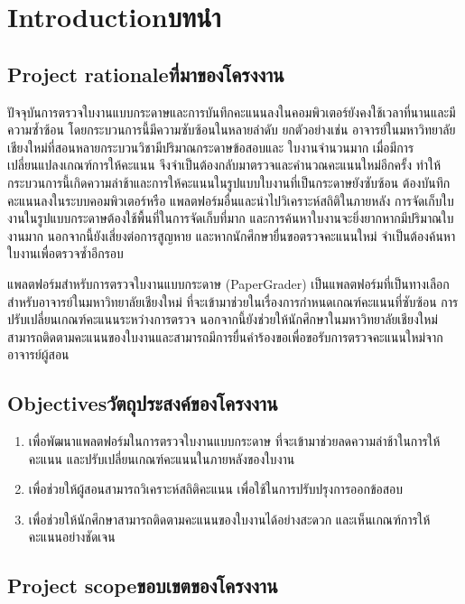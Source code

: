 \chapter{\ifenglish Introduction\else บทนำ\fi}

\section{\ifenglish Project rationale\else ที่มาของโครงงาน\fi}
\qquad ปัจจุบันการตรวจใบงานแบบกระดาษและการบันทึกคะแนนลงในคอมพิวเตอร์ยังคงใช้เวลาที่นานและมีความซ้ำซ้อน โดยกระบวนการนี้มีความซับซ้อนในหลายลำดับ ยกตัวอย่างเช่น อาจารย์ในมหาวิทยาลัยเชียงใหม่ที่สอนหลายกระบวนวิชามีปริมาณกระดาษข้อสอบและ ใบงานจำนวนมาก เมื่อมีการเปลี่ยนแปลงเกณฑ์การให้คะแนน จึงจำเป็นต้องกลับมาตรวจและคำนวณคะแนนใหม่อีกครั้ง ทำให้กระบวนการนี้เกิดความล่าช้าและการให้คะแนนในรูปแบบใบงานที่เป็นกระดาษยังซับซ้อน  ต้องบันทึกคะแนนลงในระบบคอมพิวเตอร์หรือ 
แพลตฟอร์มอื่นและนำไปวิเคราะห์สถิติในภายหลัง  การจัดเก็บใบงานในรูปแบบกระดาษต้องใช้พื้นที่ในการจัดเก็บที่มาก และการค้นหาใบงานจะยิ่งยากหากมีปริมาณใบงานมาก นอกจากนี้ยังเสี่ยงต่อการสูญหาย และหากนักศึกษายื่นขอตรวจคะแนนใหม่ จำเป็นต้องค้นหาใบงานเพื่อตรวจซ้ำอีกรอบ 

\qquad แพลตฟอร์มสำหรับการตรวจใบงานแบบกระดาษ (PaperGrader) เป็นแพลตฟอร์มที่เป็นทางเลือกสำหรับอาจารย์ในมหาวิทยาลัยเชียงใหม่ ที่จะเข้ามาช่วยในเรื่องการกำหนดเกณฑ์คะแนนที่ซับซ้อน การปรับเปลี่ยนเกณฑ์คะแนนระหว่างการตรวจ นอกจากนี้ยังช่วยให้นักศึกษาในมหาวิทยาลัยเชียงใหม่ สามารถติดตามคะแนนของใบงานและสามารถมีการยื่นคำร้องขอเพื่อขอรับการตรวจคะแนนใหม่จากอาจารย์ผู้สอน

\section{\ifenglish Objectives\else วัตถุประสงค์ของโครงงาน\fi}
    \begin{enumerate}
        \item เพื่อพัฒนาแพลตฟอร์มในการตรวจใบงานแบบกระดาษ  ที่จะเข้ามาช่วยลดความล่าช้าในการให้คะแนน และปรับเปลี่ยนเกณฑ์คะแนนในภายหลังของใบงาน
        \item เพื่อช่วยให้ผู้สอนสามารถวิเคราะห์สถิติคะแนน เพื่อใช้ในการปรับปรุงการออกข้อสอบ
        \item เพื่อช่วยให้นักศึกษาสามารถติดตามคะแนนของใบงานได้อย่างสะดวก และเห็นเกณฑ์การให้คะแนนอย่างชัดเจน
    \end{enumerate}

\section{\ifenglish Project scope\else ขอบเขตของโครงงาน\fi}

